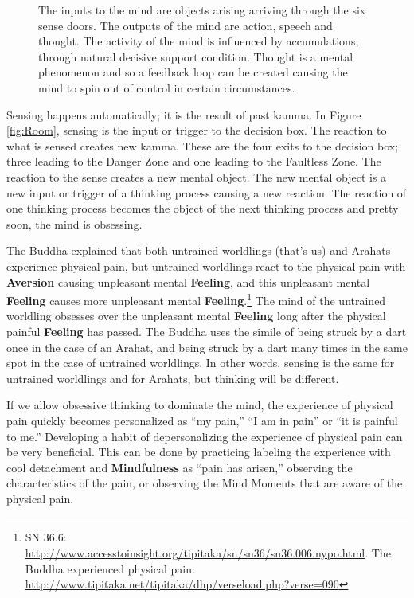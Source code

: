 \begin{figure}[H]
\centering

\caption{The inputs to the mind are objects arising arriving through the six sense doors. The outputs of the mind are action, speech and thought. The activity of the mind is influenced by accumulations, through natural decisive support condition. Thought is a mental phenomenon and so a feedback loop can be created causing the mind to spin out of control in certain circumstances.}
\label{fig:Feedback}
\end{figure}

Sensing happens automatically; it is the result of past kamma. In Figure \ref{fig:Room}, sensing is the input or trigger to the decision box. The reaction to what is sensed creates new kamma. These are the four exits to the decision box; three leading to the Danger Zone and one leading to the Faultless Zone. The reaction to the sense creates a new mental object. The new mental object is a new input or trigger of a thinking process causing a new reaction. The reaction of one thinking process becomes the object of the next thinking process and pretty soon, the mind is obsessing.

The Buddha explained that both untrained worldlings (that’s us) and Arahats experience physical pain, but untrained worldlings react to the physical pain with \textbf{Aversion} causing unpleasant mental \textbf{Feeling}, and this unpleasant mental \textbf{Feeling} causes more unpleasant mental \textbf{Feeling}.\footnote{SN 36.6: \url{http://www.accesstoinsight.org/tipitaka/sn/sn36/sn36.006.nypo.html}. The Buddha experienced physical pain: \url{http://www.tipitaka.net/tipitaka/dhp/verseload.php?verse=090}} The mind of the untrained worldling obsesses over the unpleasant mental \textbf{Feeling} long after the physical painful \textbf{Feeling} has passed. The Buddha uses the simile of being struck by a dart once in the case of an Arahat, and being struck by a dart many times in the same spot in the case of untrained worldlings. In other words, sensing is the same for untrained worldlings and for Arahats, but thinking will be different.

\pagebreak

If we allow obsessive thinking to dominate the mind, the experience of physical pain quickly becomes personalized as “my pain,” “I am in pain” or “it is painful to me.” Developing a habit of depersonalizing the experience of physical pain can be very beneficial. This can be done by practicing labeling the experience with cool detachment and \textbf{Mindfulness} as “pain has arisen,” observing the characteristics of the pain, or observing the Mind Moments that are aware of the physical pain.

